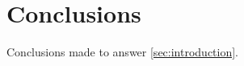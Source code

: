 \section{Conclusions}
\label{sec:conclusions}

Conclusions made to answer \autoref{sec:introduction}.